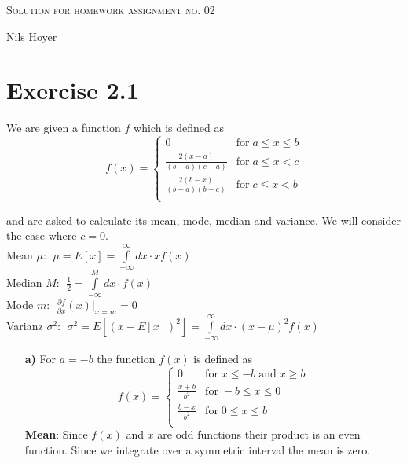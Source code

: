 \documentclass[10pt]{article}
\newenvironment{myfont}{\fontfamily{put}\selectfont}{\par}
\begin{document}
\begin{myfont}



\begin{center}
	\begin{Large}
		\textsc{Solution for homework assignment no. 02} \\
	\end{Large}
	\vspace*{0.4cm}
		Nils Hoyer
		\vspace*{1cm}
\end{center}

\section*{Exercise 2.1}

We are given a function $f$ which is defined as
\begin{equation}
f(x) =
\begin{cases}
0                           & \textrm{for}\; a \leq x \leq b \\
\frac{2(x-a)}{(b-a)(c-a)}   & \textrm{for}\; a \leq x < c \\
\frac{2(b-x)}{(b-a)(b-c)}   & \textrm{for}\; c \leq x < b \\
\end{cases}
\end{equation}

\noindent and are asked to calculate its mean, mode, median and variance.
We will consider the case where $c = 0$. \\

\noindent Mean $\mu$: $\;\mu = E[x] = \int\limits_{-\infty}^{\infty}dx \cdot xf(x)$ \\
\noindent Median $M$: $\;\frac{1}{2} = \int\limits_{-\infty}^{M}dx \cdot f(x)$ \\
\noindent Mode $m$: $\;\frac{\partial f}{\partial x}(x)|_{x = m} = 0$ \\
\noindent Varianz $\sigma^{2}$: $\;\sigma^{2} = E[(x - E[x])^{2}] = \int\limits_{-\infty}^{\infty}dx \cdot (x - \mu)^{2}f(x)$

\begin{itemize}
  \item[\textbf{a)}] For $a = -b$ the function $f(x)$ is defined as
  $$
  f(x) = 
  \begin{cases}
  0                         & \textrm{for}\; x \leq -b \; \textrm{and}\; x \geq b \\
  \frac{x+b}{b^{2}}         & \textrm{for}\; -b \leq x \leq 0 \\
  \frac{b-x}{b^{2}}         & \textrm{for}\; 0 \leq x \leq b \\
  \end{cases}
  $$
  \noindent \textbf{Mean}: Since $f(x)$ and $x$ are odd functions their product is an even function. 
  Since we integrate over a symmetric interval the mean is zero. \\


\end{itemize}
\end{myfont}
\end{document}
